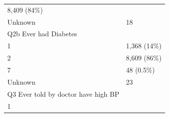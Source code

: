 \documentclass[]{article}
\begin{document}
\begin{longtable}[]{@{}ll@{}}
\begin{minipage}[t]{0.23\columnwidth}
8,409 (84\%)\strut
\end{minipage}\tabularnewline
\begin{minipage}[t]{0.71\columnwidth}\raggedright
Unknown\strut
\end{minipage} & \begin{minipage}[t]{0.23\columnwidth}\raggedright
18\strut
\end{minipage}\tabularnewline
\begin{minipage}[t]{0.71\columnwidth}\raggedright
Q2b Ever had Diabetes\strut
\end{minipage} & \begin{minipage}[t]{0.23\columnwidth}\raggedright
\strut
\end{minipage}\tabularnewline
\begin{minipage}[t]{0.71\columnwidth}\raggedright
1\strut
\end{minipage} & \begin{minipage}[t]{0.23\columnwidth}\raggedright
1,368 (14\%)\strut
\end{minipage}\tabularnewline
\begin{minipage}[t]{0.71\columnwidth}\raggedright
2\strut
\end{minipage} & \begin{minipage}[t]{0.23\columnwidth}\raggedright
8,609 (86\%)\strut
\end{minipage}\tabularnewline
\begin{minipage}[t]{0.71\columnwidth}\raggedright
7\strut
\end{minipage} & \begin{minipage}[t]{0.23\columnwidth}\raggedright
48 (0.5\%)\strut
\end{minipage}\tabularnewline
\begin{minipage}[t]{0.71\columnwidth}\raggedright
Unknown\strut
\end{minipage} & \begin{minipage}[t]{0.23\columnwidth}\raggedright
23\strut
\end{minipage}\tabularnewline
\begin{minipage}[t]{0.71\columnwidth}\raggedright
Q3 Ever told by doctor have high BP\strut
\end{minipage} & \begin{minipage}[t]{0.23\columnwidth}\raggedright
\strut
\end{minipage}\tabularnewline
\begin{minipage}[t]{0.71\columnwidth}\raggedright
1\strut
\end{minipage} & \begin{minipage}[t]{0.23\columnwidth}\raggedright

\end{minipage}
\end{longtable}
\end{document}
